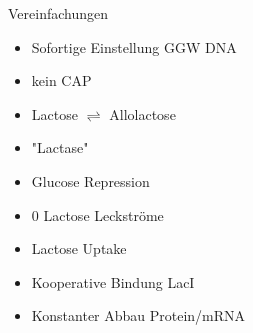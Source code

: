 \documentclass[11pt,aspectratio=169,reqno]{beamer}
\begin{document}
\begin{frame}{Vereinfachungen}
    \begin{itemize}
        \item Sofortige Einstellung GGW DNA
        \item kein CAP
        \item Lactose $\rightleftharpoons$ Allolactose
        \item "Lactase"
        \item Glucose Repression
        \item 0 Lactose Leckströme
        \item Lactose Uptake
        \item Kooperative Bindung LacI
        \item Konstanter Abbau Protein/mRNA
    \end{itemize}
\end{frame}
\end{document}
